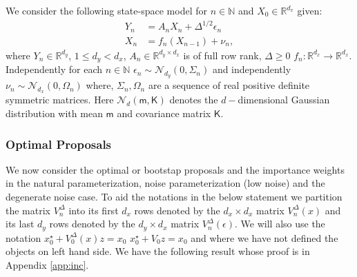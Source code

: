\documentclass[english,13pt]{article}
\numberwithin{equation}{section}
\begin{document}
We consider the following state-space model for $n\in\mathbb{N}$ and $X_0\in\mathbb{R}^{d_x}$ given:
\begin{align*}
Y_n & = A_n X_n + \Delta^{1/2}\epsilon_n \\
X_n & =  f_n(X_{n-1}) + \nu_n,
\end{align*}
where $Y_n\in\mathbb{R}^{d_y}$,  $1\leq d_y < d_x$,  $A_n\in\mathbb{R}^{d_y\times d_x}$ is of full row rank, 
$\Delta\geq 0$
$f_n:\mathbb{R}^{d_x}\rightarrow\mathbb{R}^{d_x}$. Independently for each $n\in\mathbb{N}$ $\epsilon_n\sim\mathcal{N}_{d_y}(0,\Sigma_n)$ and independently $\nu_n\sim\mathcal{N}_{d_x}(0,\Omega_n)$ where, $\Sigma_n,\Omega_n$ are a sequence of real positive definite symmetric matrices. 
Here  $\mathcal{N}_d(\mathsf{m},\mathsf{K})$ denotes the $d-$dimensional Gaussian distribution with mean $\mathsf{m}$ and covariance matrix $\mathsf{K}$.%



\subsubsection{Optimal Proposals}

We now consider the optimal or bootstap proposals and the importance weights in the natural parameterization,
noise parameterization (low noise) and the degenerate noise case.   To aid the notations in the below statement
we partition the matrix $V_n^{\Delta}$ into its first $d_x$ rows denoted by the $d_x\times d_x$ matrix $V_n^{\Delta}(x)$ and its last $d_y$ rows denoted by the $d_y\times d_x$ matrix $V_n^{\Delta}(\epsilon)$.  We will also use the notation
$x_0^{\star}+V^{\Delta}_0(x)z=x_0$ 
$x_0^{\star}+V_0z=x_0$
and where we have not defined the objects on left hand side.
We have the following result whose proof is in Appendix \ref{app:inc}.
 
\end{document}
